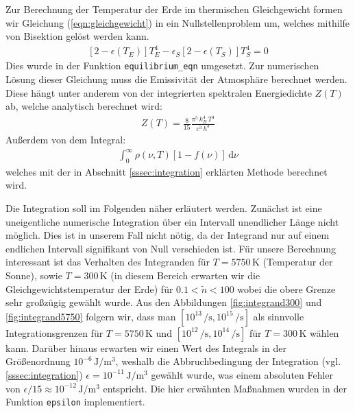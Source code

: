 \documentclass[10pt,a4paper]{article}
\begin{document}
Zur Berechnung der Temperatur der Erde im thermischen Gleichgewicht formen wir Gleichung (\ref{eqn:gleichgewicht}) in ein Nullstellenproblem um, welches mithilfe von Bisektion gelöst werden kann.
\begin{align}
	\left[2-\epsilon(T_E)\right]T_E^4 - \epsilon_S\left[2-\epsilon(T_S)\right]T_S^4 = 0
	\label{eq:nullstellenproblem}
\end{align}
Dies wurde in der Funktion \texttt{equilibrium\_eqn} umgesetzt. Zur numerischen Lösung dieser Gleichung muss die Emissivität der Atmosphäre berechnet werden. Diese hängt unter anderem von der integrierten spektralen Energiedichte $Z(T)$ ab, welche analytisch berechnet wird:
\begin{align}
	Z(T) = \frac{8}{15} \frac{\pi^5 \, k_B^4 \, T^4}{c^3 \, h^3}
\end{align}
Außerdem von dem Integral:
\begin{align}
	\int_0^\infty \rho(\nu,T)[1 - f(\nu)] \, \mathrm{d}\nu
\end{align}
welches mit der in Abschnitt \ref{sssec:integration} erklärten Methode berechnet wird.

Die Integration soll im Folgenden näher erläutert werden. Zunächst ist eine uneigentliche numerische Integration über ein Intervall unendlicher Länge nicht möglich. Dies ist in unserem Fall nicht nötig, da der Integrand nur auf einem endlichen Intervall signifikant von Null verschieden ist. Für unsere Berechnung interessant ist das Verhalten des Integranden für $T = \num{5750}\,\si{\kelvin}$ (Temperatur der Sonne), sowie $T = \num{300}\,\si{\kelvin}$ (in diesem Bereich erwarten wir die Gleichgewichtstemperatur der Erde) für $\num{0.1} < \tilde{n} < \num{100}$ wobei die obere Grenze sehr großzügig gewählt wurde. Aus den Abbildungen \ref{fig:integrand300} und \ref{fig:integrand5750} folgern wir, dass man $[10^{13}\,\si{\per\second},10^{15}\,\si{\per\second}]$ als sinnvolle Integrationsgrenzen für $T = \num{5750}\,\si{\kelvin}$ und $[10^{12}\,\si{\per\second}, 10^{14}\,\si{\per\second}]$ für $T = \num{300}\,\si{\kelvin}$ wählen kann. Darüber hinaus erwarten wir einen Wert des Integrals in der Größenordnung $10^{-6}\,\si{\joule\per\metre^3}$, weshalb die Abbruchbedingung der Integration (vgl. \ref{sssec:integration}) $\epsilon = 10^{-11}\,\si{\joule\per\metre^3}$ gewählt wurde, was einem absoluten Fehler von $\epsilon / 15 \approx 10^{-12}\,\si{\joule\per\metre^3}$ entspricht. Die hier erwähnten Maßnahmen wurden in der Funktion \texttt{epsilon} implementiert.
\end{document}
